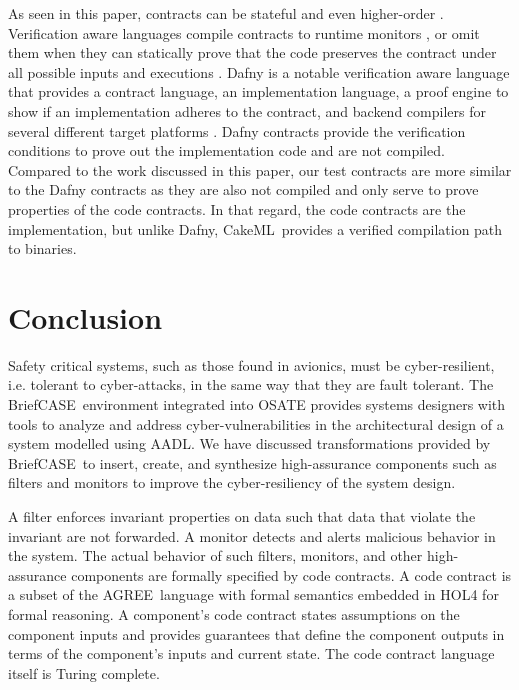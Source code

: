\documentclass[global,twocolumn]{svjour}
\newcommand{\brfcs}{BriefCASE}
\newcommand{\agr}{AGREE}
\newcommand{\ckml}{CakeML}
\begin{document}
As seen in this paper, contracts can be stateful and even higher-order \cite{10.1145/583852.581484}.
%
Verification aware languages compile contracts to runtime monitors \cite{10.1007/978-3-642-28869-2_11}, or omit them when they can statically prove that the code preserves the contract under all possible inputs and executions \cite{10.1145/3158139}.
%
Dafny is a notable verification aware language that provides a contract language, an implementation language, a proof engine to show if an implementation adheres to the contract, and backend compilers for several different target platforms \cite{dafny}.
%
Dafny contracts provide the verification conditions to prove out the implementation code and are not compiled.
%
Compared to the work discussed in this paper, our test contracts are more similar to the Dafny contracts as they are also not compiled and only serve to prove properties of the code contracts.
%
In that regard, the code contracts are the implementation, but unlike Dafny, \ckml\ provides a verified compilation path to binaries.


\section{Conclusion}
\label{sec:conclusion}

Safety critical systems, such as those found in avionics, must be cyber-resilient, i.e. tolerant to cyber-attacks, in the same way that they are fault tolerant.
%
The \brfcs\ environment integrated into OSATE provides systems designers with tools to analyze and address cyber-vulnerabilities in the architectural design of a system modelled using AADL.
%
We have discussed transformations provided by \brfcs\ to insert, create, and synthesize high-assurance components such as filters and monitors to improve the cyber-resiliency of the system design.

A filter enforces invariant properties on data such that data that violate the invariant are not forwarded.
%
A monitor detects and alerts malicious behavior in the system.
%
The actual behavior of such filters, monitors, and other high-assurance components are formally specified by code contracts.
%
A code contract is a subset of the \agr\ language with formal semantics embedded in HOL4 for formal reasoning.
%
A component's code contract states assumptions on the component inputs and provides guarantees that define the component outputs in terms of the component's inputs and current state.
%
The code contract language itself is Turing complete.
\end{document}
